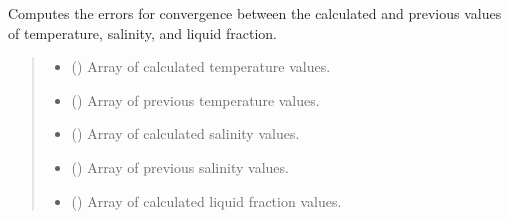 \documentclass[a4paper,11pt,english,openany]{sphinxmanual}
\begin{document}
\begin{fulllineitems}
\label{\detokenize{api/spyice.statevariables:src.spyice.statevariables.compute_error_for_convergence}}
\pysigstartsignatures
\pysiglinewithargsret
{}
{\sphinxparamcomma {}\sphinxparamcomma {}\sphinxparamcomma {}\sphinxparamcomma {}\sphinxparamcomma {}\sphinxparamcomma {}\sphinxparamcomma {}}
{}
\pysigstopsignatures
\sphinxAtStartPar
Computes the errors for convergence between the calculated and previous values of temperature, salinity, and liquid fraction.
\begin{quote}\begin{description}
\begin{itemize}
\item {} 
\sphinxAtStartPar
{} () \textendash{} Array of calculated temperature values.

\item {} 
\sphinxAtStartPar
{} () \textendash{} Array of previous temperature values.

\item {} 
\sphinxAtStartPar
{} () \textendash{} Array of calculated salinity values.

\item {} 
\sphinxAtStartPar
{} () \textendash{} Array of previous salinity values.

\item {} 
\sphinxAtStartPar
{} () \textendash{} Array of calculated liquid fraction values.


\end{itemize}
\end{description}
\end{quote}
\end{fulllineitems}
\end{document}
